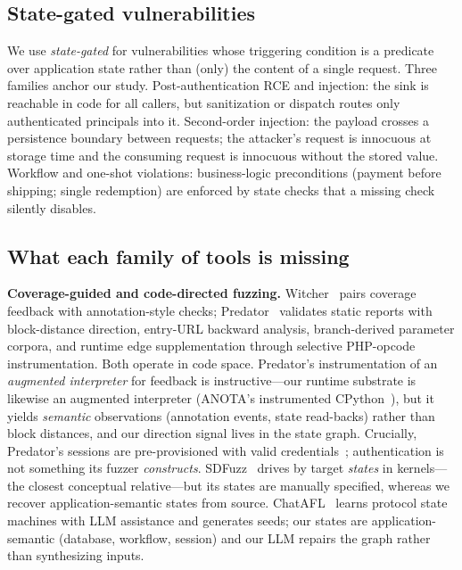 \documentclass[letterpaper,twocolumn,10pt]{article}
\begin{document}
\subsection{State-gated vulnerabilities}
We use \emph{state-gated} for vulnerabilities whose triggering condition is a predicate over application state rather than (only) the content of a single request. Three families anchor our study. Post-authentication RCE and injection: the sink is reachable in code for all callers, but sanitization or dispatch routes only authenticated principals into it. Second-order injection: the payload crosses a persistence boundary between requests; the attacker's request is innocuous at storage time and the consuming request is innocuous without the stored value. Workflow and one-shot violations: business-logic preconditions (payment before shipping; single redemption) are enforced by state checks that a missing check silently disables.

\subsection{What each family of tools is missing}
\textbf{Coverage-guided and code-directed fuzzing.} Witcher~\cite{witcher} pairs coverage feedback with annotation-style checks; Predator~\cite{predator} validates static reports with block-distance direction, entry-URL backward analysis, branch-derived parameter corpora, and runtime edge supplementation through selective PHP-opcode instrumentation. Both operate in code space. Predator's instrumentation of an \emph{augmented interpreter} for feedback is instructive---our runtime substrate is likewise an augmented interpreter (ANOTA's instrumented CPython~\cite{anota}), but it yields \emph{semantic} observations (annotation events, state read-backs) rather than block distances, and our direction signal lives in the state graph. Crucially, Predator's sessions are pre-provisioned with valid credentials~\cite{predator}; authentication is not something its fuzzer \emph{constructs}. SDFuzz~\cite{sdfuzz} drives by target \emph{states} in kernels---the closest conceptual relative---but its states are manually specified, whereas we recover application-semantic states from source. ChatAFL~\cite{chatafl} learns protocol state machines with LLM assistance and generates seeds; our states are application-semantic (database, workflow, session) and our LLM repairs the graph rather than synthesizing inputs.
\end{document}
